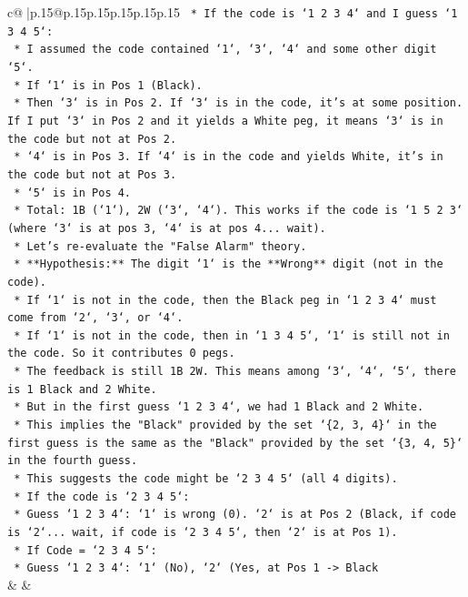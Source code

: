 \documentclass{article}
\begin{document}
{\begin{supertabular}{c@{$\;$}|p{.15\linewidth}@{}p{.15\linewidth}p{.15\linewidth}p{.15\linewidth}p{.15\linewidth}p{.15\linewidth}}
{{{\texttt{    *   If the code is `1 2 3 4` and I guess `1 3 4 5`:} \\
\texttt{        *   I assumed the code contained `1`, `3`, `4` and some other digit `5`.} \\
\texttt{        *   If `1` is in Pos 1 (Black).} \\
\texttt{        *   Then `3` is in Pos 2. If `3` is in the code, it's at some position. If I put `3` in Pos 2 and it yields a White peg, it means `3` is in the code but not at Pos 2.} \\
\texttt{        *   `4` is in Pos 3. If `4` is in the code and yields White, it's in the code but not at Pos 3.} \\
\texttt{        *   `5` is in Pos 4.} \\
\texttt{        *   Total: 1B (`1`), 2W (`3`, `4`). This works if the code is `1 5 2 3` (where `3` is at pos 3, `4` is at pos 4... wait).} \\
\texttt{    *   Let's re{-}evaluate the "False Alarm" theory.} \\
\texttt{    *   **Hypothesis:** The digit `1` is the **Wrong** digit (not in the code).} \\
\texttt{        *   If `1` is not in the code, then the Black peg in `1 2 3 4` must come from `2`, `3`, or `4`.} \\
\texttt{        *   If `1` is not in the code, then in `1 3 4 5`, `1` is still not in the code. So it contributes 0 pegs.} \\
\texttt{        *   The feedback is still 1B 2W. This means among `3`, `4`, `5`, there is 1 Black and 2 White.} \\
\texttt{        *   But in the first guess `1 2 3 4`, we had 1 Black and 2 White.} \\
\texttt{        *   This implies the "Black" provided by the set `\{2, 3, 4\}` in the first guess is the same as the "Black" provided by the set `\{3, 4, 5\}` in the fourth guess.} \\
\texttt{        *   This suggests the code might be `2 3 4 5` (all 4 digits).} \\
\texttt{        *   If the code is `2 3 4 5`:} \\
\texttt{            *   Guess `1 2 3 4`: `1` is wrong (0). `2` is at Pos 2 (Black, if code is `2`... wait, if code is `2 3 4 5`, then `2` is at Pos 1).} \\
\texttt{            *   If Code = `2 3 4 5`:} \\
\texttt{                *   Guess `1 2 3 4`: `1` (No), `2` (Yes, at Pos 1 {-}> Black} \\
            }
        }
    }
    & & \\ \\


\end{supertabular}}
\end{document}

